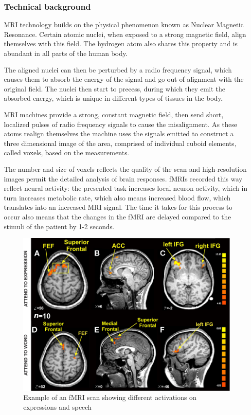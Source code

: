 	
		\subsubsection{Technical background}
		
		MRI technology builds on the physical phenomenon known as Nuclear Magnetic Resonance. Certain atomic nuclei, when exposed to a strong magnetic field, align themselves with this field. The hydrogen atom also shares this property and is abundant in all parts of the human body. 
		
		The aligned nuclei can then be perturbed by a radio frequency signal, which causes them to absorb the energy of the signal and go out of alignment with the original field. The nuclei then start to precess, during which they emit the absorbed energy, which is unique in different types of tissues in the body\cite{plewes2012physics}.
		
		MRI machines provide a strong, constant magnetic field, then send short, localized pulses of radio frequency signals to cause the misalignment. As these atoms realign themselves the machine uses the signals emitted to construct a three dimensional image of the area, comprised of individual cuboid elements, called voxels, based on the measurements.
		
		The number and size of voxels reflects the quality of the scan and high-resolution images permit the detailed analysis of brain responses. fMRIs recorded this way reflect neural activity: the presented task increases local neuron activity, which in turn increases metabolic rate, which also means increased blood flow, which translates into an increased MRI signal. The time it takes for this process to occur also means that the changes in the fMRI are delayed compared to the stimuli of the patient by 1-2 seconds\cite{deyoe1994functional}.
		
		\begin{figure}[!h]
			\centering
			\includegraphics[width=\textwidth]{figures/fmri_example.jpg}
			\caption{Example of an fMRI scan showing different activations on expressions and speech\cite{ovaysikia2011word}}
		\end{figure}
		
